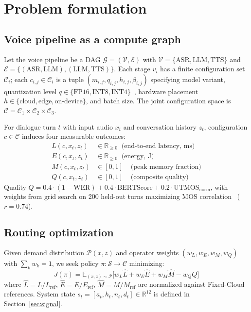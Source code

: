 \documentclass{article}
\begin{document}
\section{Problem formulation}
\label{sec:formulation}

\subsection{Voice pipeline as a compute graph}

Let the voice pipeline be a DAG $\mathcal{G}=(\mathcal{V},\mathcal{E})$ with $\mathcal{V}=\{\text{ASR},\text{LLM},\text{TTS}\}$ and $\mathcal{E}=\{(\text{ASR},\text{LLM}),(\text{LLM},\text{TTS})\}$. Each stage $v_i$ has a finite configuration set $\mathcal{C}_i$; each $c_{i,j}\in\mathcal{C}_i$ is a tuple $(m_{i,j}, q_{i,j}, h_{i,j}, \beta_{i,j})$ specifying model variant, quantization level $q\in\{\text{FP16},\text{INT8},\text{INT4}\}$~\citep{jacob2018quantization,frantar2022gptq,lin2024awq}, hardware placement $h\in\{\text{cloud},\text{edge},\text{on-device}\}$, and batch size. The joint configuration space is $\mathcal{C}=\mathcal{C}_1\times\mathcal{C}_2\times\mathcal{C}_3$.

For dialogue turn $t$ with input audio $x_t$ and conversation history $z_t$, configuration $c\in\mathcal{C}$ induces four measurable outcomes:
\begin{align}
L(c,x_t,z_t) &\in \mathbb{R}_{\geq 0} \;\;\text{(end-to-end latency, ms)} \label{eq:L}\\
E(c,x_t,z_t) &\in \mathbb{R}_{\geq 0} \;\;\text{(energy, J)} \label{eq:E}\\
M(c,x_t,z_t) &\in [0,1] \;\;\;\;\text{(peak memory fraction)} \label{eq:M}\\
Q(c,x_t,z_t) &\in [0,1] \;\;\;\;\text{(composite quality)} \label{eq:Q}
\end{align}
Quality $Q = 0.4\cdot(1-\text{WER}) + 0.4\cdot\text{BERTScore} + 0.2\cdot\text{UTMOS}_{\text{norm}}$, with weights from grid search on 200 held-out turns maximizing MOS correlation~\citep{ribeiro2011crowdmos,saeki2022utmos,zhang2020bertscore} ($r=0.74$).

\subsection{Routing optimization}

Given demand distribution $\mathcal{P}(x,z)$ and operator weights $(w_L,w_E,w_M,w_Q)$ with $\sum_k w_k=1$, we seek policy $\pi:\mathcal{S}\to\mathcal{C}$ minimizing:
\begin{equation}
J(\pi) = \mathbb{E}_{(x,z)\sim\mathcal{P}}\bigl[w_L\hat{L} + w_E\hat{E} + w_M\hat{M} - w_QQ\bigr]
\label{eq:objective}
\end{equation}
where $\hat{L}=L/L_{\text{ref}}$, $\hat{E}=E/E_{\text{ref}}$, $\hat{M}=M/M_{\text{ref}}$ are normalized against Fixed-Cloud references. System state $s_t=[a_t,h_t,n_t,d_t]\in\mathbb{R}^{12}$ is defined in Section~\ref{sec:signal}.
\end{document}
